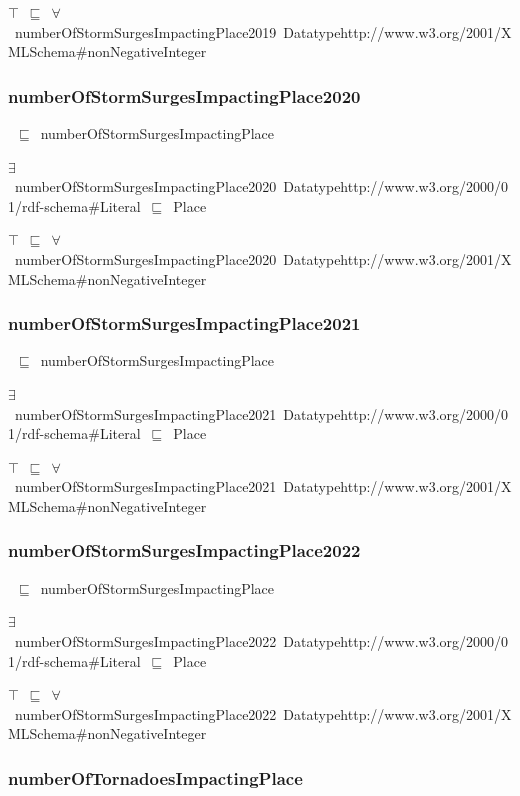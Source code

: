 \documentclass{article}
\begin{document}
\ensuremath{\top}~\ensuremath{\sqsubseteq}~\ensuremath{\forall}~numberOfStormSurgesImpactingPlace2019~Datatypehttp://www.w3.org/2001/XMLSchema#nonNegativeInteger

\subsubsection*{numberOfStormSurgesImpactingPlace2020}

~\ensuremath{\sqsubseteq}~numberOfStormSurgesImpactingPlace

\ensuremath{\exists}~numberOfStormSurgesImpactingPlace2020~Datatypehttp://www.w3.org/2000/01/rdf-schema#Literal~\ensuremath{\sqsubseteq}~Place

\ensuremath{\top}~\ensuremath{\sqsubseteq}~\ensuremath{\forall}~numberOfStormSurgesImpactingPlace2020~Datatypehttp://www.w3.org/2001/XMLSchema#nonNegativeInteger

\subsubsection*{numberOfStormSurgesImpactingPlace2021}

~\ensuremath{\sqsubseteq}~numberOfStormSurgesImpactingPlace

\ensuremath{\exists}~numberOfStormSurgesImpactingPlace2021~Datatypehttp://www.w3.org/2000/01/rdf-schema#Literal~\ensuremath{\sqsubseteq}~Place

\ensuremath{\top}~\ensuremath{\sqsubseteq}~\ensuremath{\forall}~numberOfStormSurgesImpactingPlace2021~Datatypehttp://www.w3.org/2001/XMLSchema#nonNegativeInteger

\subsubsection*{numberOfStormSurgesImpactingPlace2022}

~\ensuremath{\sqsubseteq}~numberOfStormSurgesImpactingPlace

\ensuremath{\exists}~numberOfStormSurgesImpactingPlace2022~Datatypehttp://www.w3.org/2000/01/rdf-schema#Literal~\ensuremath{\sqsubseteq}~Place

\ensuremath{\top}~\ensuremath{\sqsubseteq}~\ensuremath{\forall}~numberOfStormSurgesImpactingPlace2022~Datatypehttp://www.w3.org/2001/XMLSchema#nonNegativeInteger

\subsubsection*{numberOfTornadoesImpactingPlace}
\end{document}
